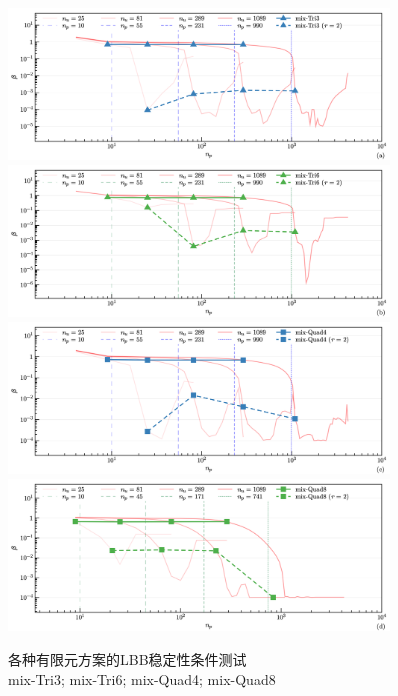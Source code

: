 \begin{figure}[H]
    \centering
    \begin{subcaptiongroup}
    \includegraphics[width=0.9\textwidth]{figures/ch_4/infsup_tri3.png}\label{a}
    \includegraphics[width=0.9\textwidth]{figures/ch_4/infsup_tri6.png}\label{b}
    \includegraphics[width=0.9\textwidth]{figures/ch_4/infsup_quad.png}\label{c}
    \includegraphics[width=0.9\textwidth]{figures/ch_4/infsup_quad8.png}\label{d}
    \end{subcaptiongroup}
    \captionsetup{aboveskip=0pt}
    \caption{\centering 各种有限元方案的LBB稳定性条件测试 \\  mix-Tri3;  mix-Tri6;  mix-Quad4; mix-Quad8}\label{ch_4:fig:infsup_convergence}
\end{figure}


